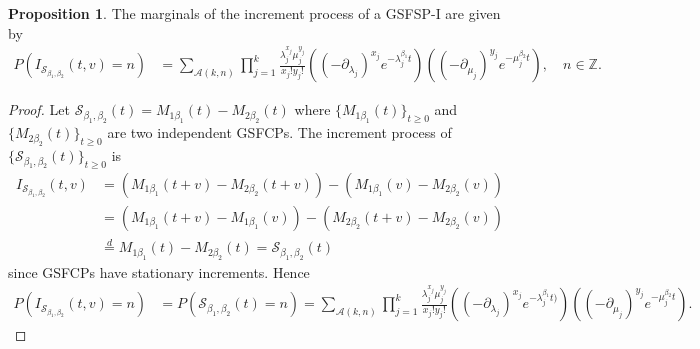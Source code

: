 \documentclass[11pt,oneside,reqno]{amsart}
\theoremstyle{definition}
\newtheorem{proposition}{Proposition}[section]
\theoremstyle{remarkstyle}
\begin{document}
\begin{proposition}\label{p.m.f._increment_GSFSP-I}
    The marginals of the increment process of a GSFSP-I are given by
    \begin{align*}
    P(I_{\mathcal{S}_{\beta_1,\beta_2}}(t,v)=n)&=\sum_{\mathcal{A}(k,n)}\prod_{j=1}^{k}\frac{\lambda_j^{x_j}\mu_j^{y_j}}{x_j!y_j!}((-\partial_{\lambda_j})^{x_j}e^{-\lambda_j^{\beta_1} t})((-\partial_{\mu_j})^{y_j}e^{-\mu_j^{\beta_2} t}),\quad n\in\mathbb{Z}.
\end{align*}
\end{proposition}
\begin{proof}
Let $\mathcal{S}_{\beta_1,\beta_2}(t)=M_{1\beta_1}(t)-M_{2\beta_2}(t)$ where $\{M_{1\beta_1}(t)\}_{t\geq 0}$ and $\{M_{2\beta_2}(t)\}_{t\geq 0}$ are two independent GSFCPs. The increment process of $\{\mathcal{S}_{\beta_1,\beta_2}(t)\}_{t\ge 0}$ is
\begin{align*}
I_{\mathcal{S}_{\beta_1,\beta_2}}(t,v)&=(M_{1\beta_1}(t+v)-M_{2\beta_2}(t+v))-(M_{1\beta_1}(v)-M_{2\beta_2}(v)) \\
&=
(M_{1\beta_1}(t+v)-M_{1\beta_1}(v))-(M_{2\beta_2}(t+v)-M_{2\beta_2}(v))\\
&\overset{d}{=} M_{1\beta_1}(t)-M_{2\beta_2}(t)=\mathcal{S}_{\beta_1,\beta_2}(t)
\end{align*}
since GSFCPs have stationary increments. Hence 
\begin{align} 
    P(I_{\mathcal{S}_{\beta_1,\beta_2}}(t,v)=n)
    &=P(\mathcal{S}_{\beta_1,\beta_2}(t)=n)=\sum_{\mathcal{A}(k,n)}\prod_{j=1}^{k}\frac{\lambda_j^{x_j}\mu_j^{y_j}}{x_j!y_j!}((-\partial_{\lambda_j})^{x_j}e^{-\lambda_j^{\beta_1} t)})((-\partial_{\mu_j})^{y_j}e^{-\mu_j^{\beta_2} t}).\label{incrementGSTFSP1}
 \end{align}
\end{proof}
\end{document}
